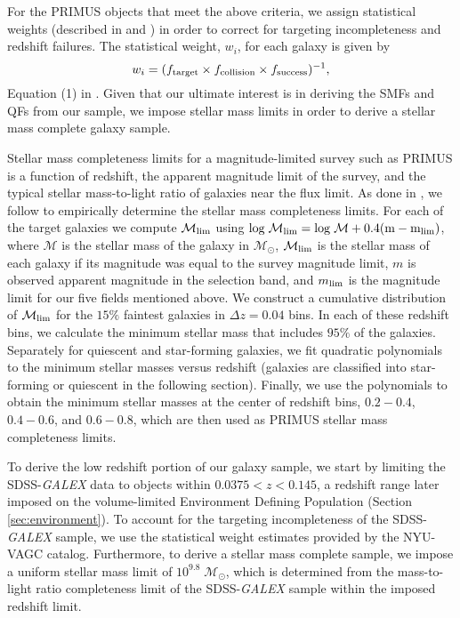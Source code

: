 \documentclass{emulateapj}
\begin{document}
For the PRIMUS objects that meet the above criteria, we assign statistical weights (described in \cite{Coil:2011aa} and \cite{Cool:2013aa}) in order to correct for targeting incompleteness and redshift failures. The statistical weight, $w_i$, for each galaxy is given by
\begin{equation}
w_{i} = (f_{\rm{target}} \times f_{\rm{collision}} \times f_{\rm{success}})^{-1},
\end{equation}
Equation (1) in \cite{Moustakas:2013aa}. Given that our ultimate interest is in deriving the SMFs and QFs from our sample, we impose stellar mass limits in order to derive a stellar mass complete galaxy sample. 

Stellar mass completeness limits for a magnitude-limited survey such as PRIMUS is a function of redshift, the apparent magnitude limit of the survey, and the typical stellar mass-to-light ratio of galaxies near the flux limit. As done in \cite{Moustakas:2013aa}, we follow \cite{Pozzetti:2010aa} to empirically determine the stellar mass completeness limits. For each of the target galaxies we compute $\mathcal{M}_{\rm{lim}}$ using $\rm{log} \; \mathcal{M}_{\rm{lim}} = \rm{log} \; \mathcal{M} + 0.4 ( m - m_{\rm{lim}})$, where $\mathcal{M}$ is the stellar mass of the galaxy in $\mathcal{M_{\odot}}$, $\mathcal{M}_{\rm{lim}}$ is the stellar mass of each galaxy if its magnitude was equal to the survey magnitude limit, $m$ is observed apparent magnitude in the selection band, and $m_{\rm{lim}}$ is the magnitude limit for our five fields mentioned above. We construct a cumulative distribution of $\mathcal{M}_{\rm{lim}}$ for the $15\%$ faintest galaxies in $\Delta z=0.04$ bins. In each of these redshift bins, we calculate the minimum stellar mass that includes $95 \%$ of the galaxies. Separately for quiescent and star-forming galaxies, we fit quadratic polynomials to the minimum stellar masses versus redshift (galaxies are classified into star-forming or quiescent in the following section). Finally, we use the polynomials to obtain the minimum stellar masses at the center of redshift bins, $0.2-0.4$, $0.4-0.6$, and $0.6-0.8$, which are then used as PRIMUS stellar mass completeness limits.

To derive the low redshift portion of our galaxy sample, we start by limiting the SDSS-{\em GALEX} data to objects within $0.0375 < z < 0.145$, a redshift range later imposed on the volume-limited Environment Defining Population (Section \ref{sec:environment}). To account for the targeting incompleteness of the SDSS-{\em GALEX} sample, we use the statistical weight estimates provided by the NYU-VAGC catalog. Furthermore, to derive a stellar mass complete sample, we impose a uniform stellar mass limit of $10^9.8 \; \mathcal{M}_{\odot}$, which is determined from the mass-to-light ratio completeness limit of the SDSS-{\em GALEX} sample within the imposed redshift limit. 
\end{document}
